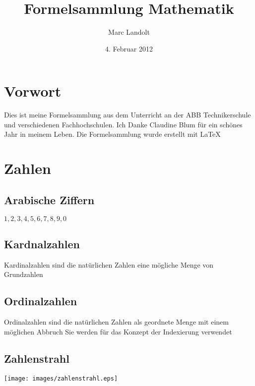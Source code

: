 \documentclass[a4paper]{scrartcl}
\title{Formelsammlung Mathematik}
\author{Marc Landolt}
\date{4. Februar 2012}
\begin{document}
 
\maketitle
\tableofcontents

\section*{Vorwort}
Dies ist meine Formelsammlung aus dem Unterricht an der ABB Technikerschule und verschiedenen Fachhochschulen. Ich Danke Claudine Blum für ein schönes Jahr in meinem Leben.
Die Formelsammlung wurde erstellt mit \LaTeX{}

\newpage

\section{Zahlen}
\subsection{Arabische Ziffern}
$1, 2, 3, 4, 5, 6, 7, 8, 9, 0$

\subsection{Kardnalzahlen}
Kardinalzahlen sind die natürlichen Zahlen eine mögliche Menge von Grundzahlen

\subsection{Ordinalzahlen}
Ordinalzahlen sind die natürlichen Zahlen als geordnete Menge mit einem möglichen Abbruch
Sie werden für das Konzept der Indexierung verwendet

\subsection{Zahlenstrahl}
\texttt{[image: images/zahlenstrahl.eps]}
\newline
\end{document}
